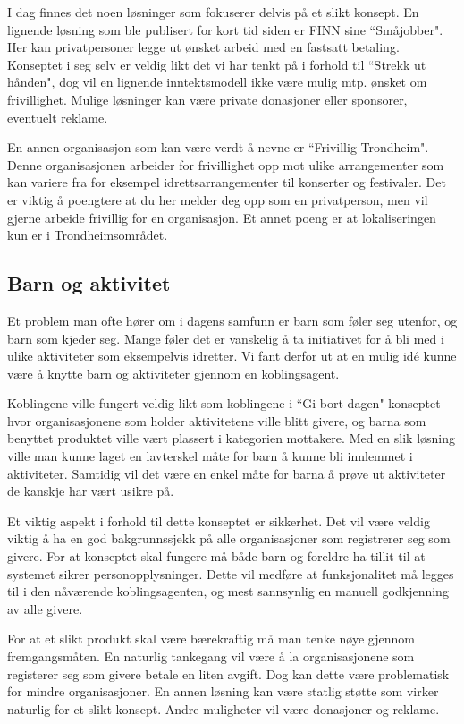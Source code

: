 I dag finnes det noen løsninger som fokuserer delvis på et slikt konsept. En lignende løsning som ble publisert for kort tid siden er FINN sine ``Småjobber". Her kan privatpersoner legge ut ønsket arbeid med en fastsatt betaling. Konseptet i seg selv er veldig likt det vi har tenkt på i forhold til ``Strekk ut hånden", dog vil en lignende inntektsmodell ikke være mulig mtp. ønsket om frivillighet. Mulige løsninger kan være private donasjoner eller sponsorer, eventuelt reklame.

En annen organisasjon som kan være verdt å nevne er ``Frivillig Trondheim". Denne organisasjonen arbeider for frivillighet opp mot ulike arrangementer som kan variere fra for eksempel idrettsarrangementer til konserter og festivaler. Det er viktig å poengtere at du her melder deg opp som en privatperson, men vil gjerne arbeide frivillig for en organisasjon. Et annet poeng er at lokaliseringen kun er i Trondheimsområdet.

\subsection{Barn og aktivitet}
Et problem man ofte hører om i dagens samfunn er barn som føler seg utenfor, og barn som kjeder seg. Mange føler det er vanskelig å ta initiativet for å bli med i ulike aktiviteter som eksempelvis idretter. Vi fant derfor ut at en mulig idé kunne være å knytte barn og aktiviteter gjennom en koblingsagent.

Koblingene ville fungert veldig likt som koblingene i ``Gi bort dagen"-konseptet hvor organisasjonene som holder aktivitetene ville blitt givere, og barna som benyttet produktet ville vært plassert i kategorien mottakere. Med en slik løsning ville man kunne laget en lavterskel måte for barn å kunne bli innlemmet i aktiviteter. Samtidig vil det være en enkel måte for barna å prøve ut aktiviteter de kanskje har vært usikre på.

Et viktig aspekt i forhold til dette konseptet er sikkerhet. Det vil være veldig viktig å ha en god bakgrunnssjekk på alle organisasjoner som registrerer seg som givere. For at konseptet skal fungere må både barn og foreldre ha tillit til at systemet sikrer personopplysninger. Dette vil medføre at funksjonalitet må legges til i den nåværende koblingsagenten, og mest sannsynlig en manuell godkjenning av alle givere.

For at et slikt produkt skal være bærekraftig må man tenke nøye gjennom fremgangsmåten. En naturlig tankegang vil være å la organisasjonene som registerer seg som givere betale en liten avgift. Dog kan dette være problematisk for mindre organisasjoner. En annen løsning kan være statlig støtte som virker naturlig for et slikt konsept. Andre muligheter vil være donasjoner og reklame.

